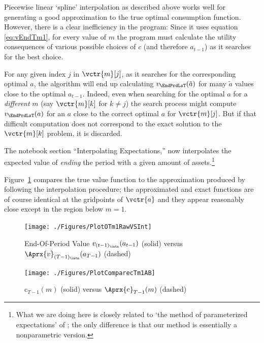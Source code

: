 \documentclass[titlepage, headings=optiontotocandhead]{econtex}
\begin{document}
Piecewise linear `spline' interpolation as described above works well for generating a good approximation to the true optimal consumption function. However, there is a clear inefficiency in the program: Since it uses equation \eqref{eq:vEndTm1}, for every value of $m$ the program must calculate the utility consequences of various possible choices of $c$ (and therefore $a_{t-1}$) as it searches for the best choice.

For any given index $j$ in $\vctr{m}[j]$, as it searches for the corresponding optimal $a$, the algorithm will end up  calculating $v_{\EndPrdLsT}(\tilde{a})$ for many $\tilde{a}$ values close to the optimal $a_{t-1}$.  Indeed, even when searching for the optimal $a$ for a \emph{different} $m$ (say $\vctr{m}[k]$ for $k \neq j$) the search process might compute $v_{\EndPrdLsT}(a)$ for an $a$ close to the correct optimal $a$ for $\vctr{m}[j]$. But if that difficult computation does not correspond to the exact solution to the $\vctr{m}[k]$ problem, it is discarded.  


The notebook section ``Interpolating Expectations,'' now interpolates the expected value of \textit{ending} the period with a given amount of assets.\footnote{What we are doing here is closely related to `the method of parameterized expectations' of \cite{denHaanMarcet:parameterized}; the only difference is that our method is essentially a nonparametric version.}  %

Figure~\ref{fig:PlotOTm1RawVSInt} compares the true value function to the approximation produced by following the interpolation procedure; the approximated and exact functions are of course identical at the gridpoints of $\vctr{a}$ and they appear reasonably close except in the region below $m=1$.

\hypertarget{PlotOTm1RawVSInt}{}
\begin{figure}
  \centerline{\texttt{[image: ./Figures/PlotOTm1RawVSInt]}}
  \caption{End-Of-Period Value $v_{(t-1)_\cntn}(a_{t-1})$ (solid) versus $\Aprx{v}_{({T-1})_\cntn}(a_{T-1})$ (dashed)}
  \label{fig:PlotOTm1RawVSInt}
\end{figure}

\hypertarget{PlotComparecTm1AB}{}
\begin{figure}
  \centerline{\texttt{[image: ./Figures/PlotComparecTm1AB]}}
  \caption{$\mathrm{c}_{T-1}(m)$ (solid) versus $\Aprx{\mathrm{c}}_{T-1}(m)$ (dashed)}
  \label{fig:PlotComparecTm1AB}
\end{figure}
\end{document}
